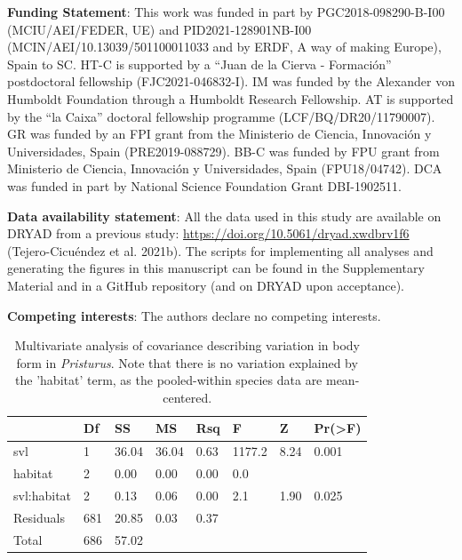 \documentclass[
  11pt,
]{article}
\begin{document}
\textbf{Funding Statement}: This work was funded in part by
PGC2018-098290-B-I00 (MCIU/AEI/FEDER, UE) and PID2021-128901NB-I00
(MCIN/AEI/10.13039/501100011033 and by ERDF, A way of making Europe),
Spain to SC. HT-C is supported by a ``Juan de la Cierva - Formación''
postdoctoral fellowship (FJC2021-046832-I). IM was funded by the
Alexander von Humboldt Foundation through a Humboldt Research
Fellowship. AT is supported by the ``la Caixa'' doctoral fellowship
programme (LCF/BQ/DR20/11790007). GR was funded by an FPI grant from the
Ministerio de Ciencia, Innovación y Universidades, Spain
(PRE2019-088729). BB-C was funded by FPU grant from Ministerio de
Ciencia, Innovación y Universidades, Spain (FPU18/04742). DCA was funded
in part by National Science Foundation Grant DBI-1902511.

\textbf{Data availability statement}: All the data used in this study
are available on DRYAD from a previous study:
\url{https://doi.org/10.5061/dryad.xwdbrv1f6} (Tejero-Cicuéndez et al.
2021b). The scripts for implementing all analyses and generating the
figures in this manuscript can be found in the Supplementary Material
and in a GitHub repository (and on DRYAD upon acceptance).

\textbf{Competing interests}: The authors declare no competing
interests.

\newpage

\begin{table}[H]

\caption{\label{tab:unnamed-chunk-1}Multivariate analysis of covariance describing variation in body form in \textit{Pristurus}. Note that there is no variation explained by the 'habitat' term, as the pooled-within species data are mean-centered.}
\centering
\begin{tabular}[t]{llllllll}
\toprule
  & Df & SS & MS & Rsq & F & Z & Pr(>F)\\
\midrule
svl & 1 & 36.04 & 36.04 & 0.63 & 1177.2 & 8.24 & 0.001\\
habitat & 2 & 0.00 & 0.00 & 0.00 & 0.0 &  & \\
svl:habitat & 2 & 0.13 & 0.06 & 0.00 & 2.1 & 1.90 & 0.025\\
Residuals & 681 & 20.85 & 0.03 & 0.37 &  &  & \\
Total & 686 & 57.02 &  &  &  &  & \\
\bottomrule
\end{tabular}
\end{table}

\newpage
\end{document}
